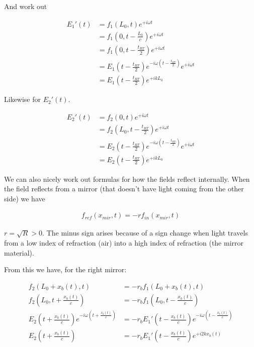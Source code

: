 \documentclass[12pt]{article}
\begin{document}
And work out

\begin{align}
E_1'(t) &= f_1(L_0, t)e^{+i\omega t}\\
&= f_1\left(0, t-\frac{L_0}{c}\right) e^{+i\omega t}\\
&= f_1\left(0, t-\frac{t_{RT}}{2}\right)e^{+i\omega t}\\
&= E_1\left(t-\frac{t_{RT}}{2}\right) e^{-i\omega \left(t-\frac{t_{RT}}{2}\right)}e^{+i\omega t}\\
&= E_1\left(t-\frac{t_{RT}}{2}\right) e^{+ikL_0}
\end{align}

Likewise for $E_2'(t)$.

\begin{align}
E_2'(t) &= f_2(0, t)e^{+i\omega t}\\
&= f_2\left(L_0, t-\frac{t_{RT}}{2}\right) e^{+i\omega t}\\
&= E_2\left(t-\frac{t_{RT}}{2}\right) e^{-i\omega\left(t-\frac{t_{RT}}{2}\right)}e^{+i\omega t}\\
&= E_2\left(t-\frac{t_{RT}}{2}\right)e^{+ikL_0}
\end{align}

We can also nicely work out formulas for how the fields reflect internally. When the field reflects from a mirror (that doesn't have light coming from the other side) we have

\begin{align}
f_{ref}(x_{mir}, t) = -r f_{in}(x_{mir}, t)
\end{align}

$r = \sqrt{R} > 0$.
The minus sign arises because of a sign change when light travels from a low index of refraction (air) into a high index of refraction (the mirror material).

From this we have, for the right mirror:

\begin{align}
f_2(L_0 + x_b(t), t) &= -r_bf_1(L_0 + x_b(t), t)\\
f_2\left(L_0, t + \frac{x_b(t)}{c}\right) &= -r_b f_1\left(L_0, t-\frac{x_b(t)}{c}\right)\\
E_2\left(t+\frac{x_b(t)}{c}\right) e^{-i\omega\left(t+\frac{x_b(t)}{c}\right)} &= -r_b E_1'\left(t-\frac{x_b(t)}{c}\right) e^{-i\omega\left(t-\frac{x_b(t)}{c}\right)}\\
E_2\left(t+\frac{x_b(t)}{c}\right) &
= -r_b E_1'\left(t-\frac{x_b(t)}{c}\right)e^{+i2kx_b(t)}
\end{align}
\end{document}
